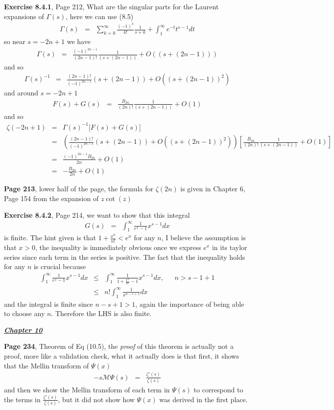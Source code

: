 \documentclass[aps,preprint,preprintnumbers,nofootinbib,showpacs,prd]{revtex4-1}
\newcommand{\nbea}{\begin{eqnarray*}}
\newcommand{\neea}{\end{eqnarray*}}
\begin{document}
{\bf Exercise 8.4.1}, Page 212, What are the singular parts for the Laurent expansions of $\Gamma(s)$, here we can use (8.5)
%
\nbea
\Gamma(s) & = & \sum_{k=0}^\infty \frac{(-1)^k}{k!} \frac{1}{s+k} + \int_1^\infty e^{-t}t^{s-1}dt
\neea
%
so near $s=-2n+1$ we have
%
\nbea
\Gamma(s) & = & \frac{(-1)^{2n-1}}{(2n-1)!} \frac{1}{(s+(2n-1))} + O((s+(2n-1)))
\neea
%
and so
%
\nbea
\Gamma(s)^{-1} & = & \frac{(2n-1)!}{(-1)^{2n-1}} (s+(2n-1)) + O((s+(2n-1))^2)
\neea
%
and around $s=-2n+1$
%
\nbea
F(s) + G(s) & = & \frac{B_{2n}}{(2n)!}\frac{1}{(s + (2n-1))} + O(1)
\neea
%
and so
%
\nbea
\zeta(-2n+1) & = & \Gamma(s)^{-1} \lbrack F(s) + G(s)\rbrack\\
& = & \left(\frac{(2n-1)!}{(-1)^{2n-1}} (s+(2n-1)) + O((s+(2n-1))^2)\right) \left\lbrack  \frac{B_{2n}}{(2n)!}\frac{1}{(s + (2n-1))} + O(1) \right\rbrack \\
& = & \frac{(-1)^{2n-1}B_{2n}}{2n} + O(1) \\
& = & -\frac{B_{2n}}{2n} + O(1)
\neea
%

{\bf Page 213}, lower half of the page, the formula for $\zeta(2n)$ is given in Chapter 6, Page 154 from the expansion of $z\cot(z)$

{\bf Exercise 8.4.2}, Page 214, we want to show that this integral
%
\nbea
G(s) & = & \int_1^\infty \frac{1}{e^x-1} x^{s-1} dx
\neea
%
is finite. The hint given is that $1 + \frac{x^n}{n!} < e^x$ for any $n$, I believe the assumption is that $x > 0$, the inequality is immediately obvious once we express $e^x$ in its taylor series since each term in the series is positive. The fact that the inequality holds for any $n$ is crucial because
%
\nbea
\int_1^\infty \frac{1}{e^x-1} x^{s-1} dx & \le & \int_1^\infty \frac{1}{1 + \frac{x^n}{n!} - 1} x^{s-1} dx, ~~~~~~~ n > s - 1 + 1 \\
& \le & n!\int_1^\infty \frac{1}{x^{n-s + 1}} dx
\neea
%
and the integral is finite since $n - s + 1 > 1$, again the importance of being able to choose any $n$. Therefore the LHS is also finite.

\bigskip
\underline{\textit{\textbf{Chapter 10}}}
\bigskip

{\bf Page 234}, Theorem of Eq (10.5), the {\it proof} of this theorem is actually not a proof, more like a validation check, what it actually does is that first, it shows that the Mellin transform of $\Psi(x)$
%
\nbea
-s\mathcal{M}\Psi(s) & = & \frac{\zeta'(s)}{\zeta(s)}
\neea
%
and then we show the Mellin transform of each term in $\Psi(s)$ to correspond to the terms in $\frac{\zeta'(s)}{\zeta(s)}$, but it did not show how $\Psi(x)$ was derived in the first place.
\end{document}

